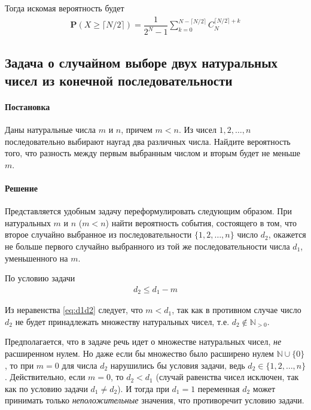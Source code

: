 \documentclass[%
	11pt,
	a4paper,
	utf8,
		]{article}
\begin{document}
Тогда искомая вероятность будет
\begin{align*}
	\boxed{ \mathbf{P} (X \geqslant \lceil N / 2 \rceil ) = \dfrac{1}{2^N - 1} \sum\limits_{k=0}^{N - \lceil N / 2 \rceil} C_N^{ \lceil N / 2 \rceil + k} }
\end{align*}

\subsection{Задача о случайном выборе двух натуральных чисел из конечной последовательности}

\paragraph{Постановка} Даны натуральные числа $ m $ и $ n $, причем $ m < n $. Из чисел $ 1, 2, \ldots, n $ последовательно выбирают наугад два различных числа. Найдите вероятность того, что разность между первым выбранным числом и вторым будет не меньше $ m $.

\paragraph{Решение} Представляется удобным задачу переформулировать следующим образом. При натуральных $ m $ и $ n $ ($ m < n $) найти вероятность события, состоящего в том, что второе случайно выбранное из последовательности $ \{1, 2, \ldots, n \} $ число $ d_2 $, окажется не больше первого случайно выбранного из той же последовательности числа $ d_1 $, уменьшенного на $ m $.

По условию задачи
\begin{align}\label{eq:d1d2}
	d_2 \leqslant d_1 - m 
\end{align}

Из неравенства \eqref{eq:d1d2} следует, что $ m < d_1 $, так как в противном случае число $ d_2 $ не будет принадлежать множеству натуральных чисел, т.е. $ d_2 \notin \mathbb{N}_{> 0} $.

Предполагается, что в задаче речь идет о множестве натуральных чисел, \emph{не} расширенном нулем. Но даже если бы множество было расширено нулем $ \mathbb{N} \cup \{0\} $, то при $ m = 0 $ для числа $ d_2 $ нарушились бы условия задачи, ведь $ d_2 \in \{ 1, 2, \ldots, n \}$ . Действительно, если $ m = 0 $, то $ d_2 < d_1 $ (случай равенства чисел исключен, так как по условию задачи $ d_1 \neq d_2 $). И тогда при $ d_1 = 1 $ переменная $ d_2 $ может принимать только \emph{неположительные} значения, что противоречит условию задачи.
\end{document}
